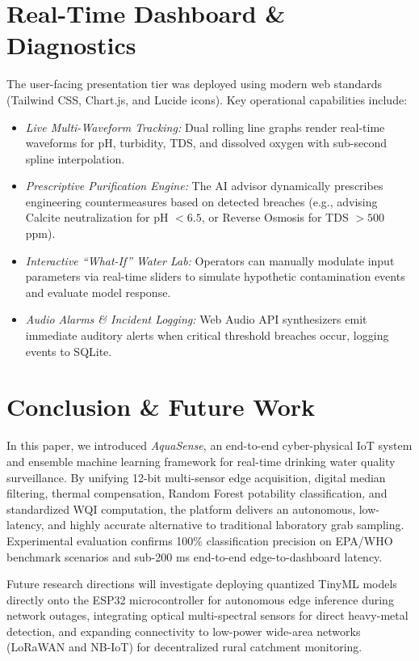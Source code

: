 \documentclass[conference]{IEEEtran}
\begin{document}
\section{Real-Time Dashboard \& Diagnostics}
The user-facing presentation tier was deployed using modern web standards (Tailwind CSS, Chart.js, and Lucide icons). Key operational capabilities include:
\begin{itemize}
    \item \textit{Live Multi-Waveform Tracking:} Dual rolling line graphs render real-time waveforms for pH, turbidity, TDS, and dissolved oxygen with sub-second spline interpolation.
    \item \textit{Prescriptive Purification Engine:} The AI advisor dynamically prescribes engineering countermeasures based on detected breaches (e.g., advising Calcite neutralization for pH $< 6.5$, or Reverse Osmosis for TDS $> 500$ ppm).
    \item \textit{Interactive ``What-If'' Water Lab:} Operators can manually modulate input parameters via real-time sliders to simulate hypothetic contamination events and evaluate model response.
    \item \textit{Audio Alarms \& Incident Logging:} Web Audio API synthesizers emit immediate auditory alerts when critical threshold breaches occur, logging events to SQLite.
\end{itemize}

\section{Conclusion \& Future Work}
In this paper, we introduced \textit{AquaSense}, an end-to-end cyber-physical IoT system and ensemble machine learning framework for real-time drinking water quality surveillance. By unifying 12-bit multi-sensor edge acquisition, digital median filtering, thermal compensation, Random Forest potability classification, and standardized WQI computation, the platform delivers an autonomous, low-latency, and highly accurate alternative to traditional laboratory grab sampling. Experimental evaluation confirms 100\% classification precision on EPA/WHO benchmark scenarios and sub-200 ms end-to-end edge-to-dashboard latency.

Future research directions will investigate deploying quantized TinyML models directly onto the ESP32 microcontroller for autonomous edge inference during network outages, integrating optical multi-spectral sensors for direct heavy-metal detection, and expanding connectivity to low-power wide-area networks (LoRaWAN and NB-IoT) for decentralized rural catchment monitoring.
\end{document}
